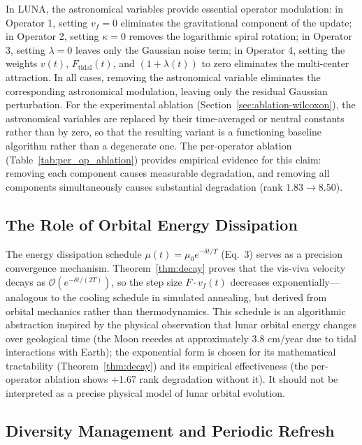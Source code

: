\documentclass[review]{elsarticle}
\theoremstyle{definition}
\begin{document}
In LUNA, the astronomical variables provide essential operator modulation: in Operator 1, setting $v_f = 0$ eliminates the gravitational component of the update; in Operator 2, setting $\kappa = 0$ removes the logarithmic spiral rotation; in Operator 3, setting $\lambda = 0$ leaves only the Gaussian noise term; in Operator 4, setting the weights $v(t)$, $F_{\mathrm{tidal}}(t)$, and $(1+\lambda(t))$ to zero eliminates the multi-center attraction. In all cases, removing the astronomical variable eliminates the corresponding astronomical modulation, leaving only the residual Gaussian perturbation. For the experimental ablation (Section~\ref{sec:ablation-wilcoxon}), the astronomical variables are replaced by their time-averaged or neutral constants rather than by zero, so that the resulting variant is a functioning baseline algorithm rather than a degenerate one. The per-operator ablation (Table~\ref{tab:per_op_ablation}) provides empirical evidence for this claim: removing each component causes measurable degradation, and removing all components simultaneously causes substantial degradation (rank $1.83 \to 8.50$).

\subsection{The Role of Orbital Energy Dissipation}

The energy dissipation schedule $\mu(t) = \mu_0 e^{-\delta t/T}$ (Eq.\ 3) serves as a precision convergence mechanism. Theorem~\ref{thm:decay} proves that the vis-viva velocity decays as $\mathcal{O}(e^{-\delta t/(2T)})$, so the step size $F \cdot v_f(t)$ decreases exponentially---analogous to the cooling schedule in simulated annealing, but derived from orbital mechanics rather than thermodynamics. This schedule is an algorithmic abstraction inspired by the physical observation that lunar orbital energy changes over geological time (the Moon recedes at approximately 3.8 cm/year due to tidal interactions with Earth); the exponential form is chosen for its mathematical tractability (Theorem~\ref{thm:decay}) and its empirical effectiveness (the per-operator ablation shows +1.67 rank degradation without it). It should not be interpreted as a precise physical model of lunar orbital evolution.

\subsection{Diversity Management and Periodic Refresh}
\end{document}
